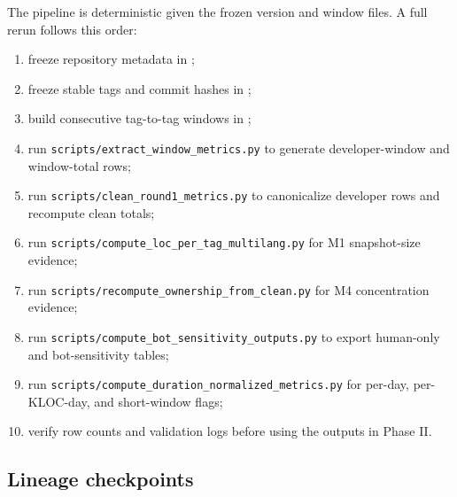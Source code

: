 The pipeline is deterministic given the frozen version and window files. A full rerun follows this order:
\begin{enumerate}[leftmargin=*]
  \item freeze repository metadata in ;
  \item freeze stable tags and commit hashes in ;
  \item build consecutive tag-to-tag windows in ;
  \item run \texttt{scripts/extract\_window\_metrics.py} to generate developer-window and window-total rows;
  \item run \texttt{scripts/clean\_round1\_metrics.py} to canonicalize developer rows and recompute clean totals;
  \item run \texttt{scripts/compute\_loc\_per\_tag\_multilang.py} for M1 snapshot-size evidence;
  \item run \texttt{scripts/recompute\_ownership\_from\_clean.py} for M4 concentration evidence;
  \item run \texttt{scripts/compute\_bot\_sensitivity\_outputs.py} to export human-only and bot-sensitivity tables;
  \item run \texttt{scripts/compute\_duration\_normalized\_metrics.py} for per-day, per-KLOC-day, and short-window flags;
  \item verify row counts and validation logs before using the outputs in Phase II.
\end{enumerate}

\subsection{Lineage checkpoints}
\label{sec:repro_lineage}

